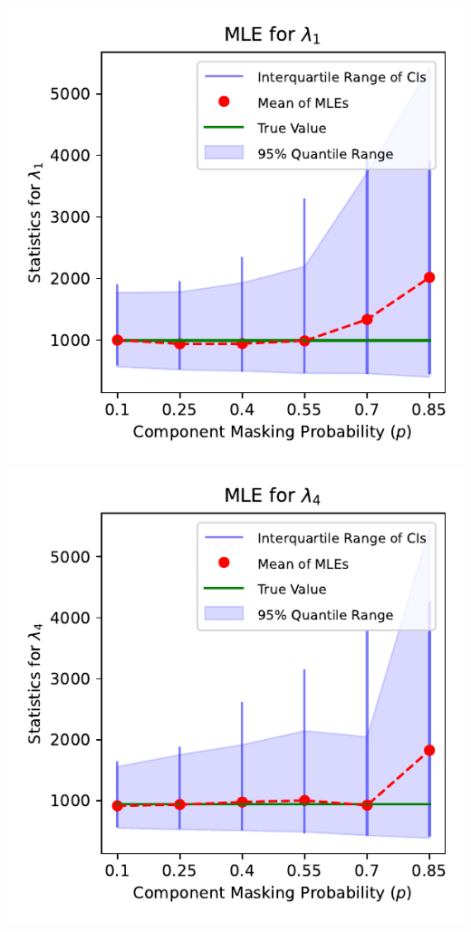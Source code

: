 \documentclass{article}
\begin{document}
\begin{minipage}[t]{0.5\textwidth}
  \centering
  \includegraphics[width=\textwidth,height=0.33\textheight,keepaspectratio]{plot-p-vs-scale.1.pdf}\\
  \vspace{0.5mm}
  \includegraphics[width=\textwidth,height=0.33\textheight,keepaspectratio]{plot-p-vs-scale.4.pdf}\\

\end{minipage}
\end{document}
